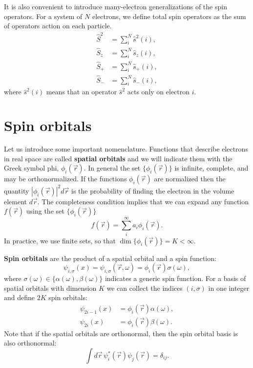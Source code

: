 \documentclass[../Main/chem532-notes.tex]{subfiles}
\begin{document}
It is also convenient to introduce many-electron generalizations of the spin operators.
For a system of $N$ electrons, we define total spin operators as the sum of operators action on each particle.
\begin{align}
\hat{S}^2 &= \sum_i^N \hat{s}^{2}(i), \\
\hat{S}_z &= \sum_i^N \hat{s}_{z}(i), \\
\hat{S}_+ &= \sum_i^N \hat{s}_{+}(i), \\
\hat{S}_- &= \sum_i^N \hat{s}_{-}(i),
\end{align}
where $\hat{s}^{2}(i)$ means that an operator $\hat{s}^{2}$ acts only on electron $i$.


\section{Spin orbitals}
Let us introduce some important nomenclature.
Functions that describe electrons in real space are called \textbf{spatial orbitals} and we will indicate them with the Greek symbol phi, $\phi_i(\vec{r})$.
In general the set $\{ \phi_i(\vec{r}) \}$ is infinite, complete, and may be orthonormalized.
If the functions $\phi_i(\vec{r})$ are normalized then the quantity $|\phi_i(\vec{r})|^2 d\vec{r}$ is the probability of finding the electron in the volume element $d\vec{r}$.
The completeness condition implies that we can expand any function $f(\vec{r})$ using the set $\{ \phi_i(\vec{r}) \}$
\begin{equation}
f(\vec{r}) = \sum_{i}^{\infty} a_i \phi_i(\vec{r}).
\end{equation}
In practice, we use finite sets, so that $\dim \{ \phi_i(\vec{r}) \} = K < \infty$.

\textbf{Spin orbitals} are the product of a spatial orbital and a spin function:
\begin{equation}
\psi_{i,\sigma} (x) = \psi_{i,\sigma} (\vec{r},\omega) = \phi_i(\vec{r}) \sigma(\omega),
\end{equation}
where $\sigma(\omega) \in \{\alpha(\omega),\beta(\omega)\}$ indicates a generic spin function.
For a basis of spatial orbitals with dimension $K$ we can collect the indices $(i,\sigma)$ in one integer and define $2K$ spin orbitals:
\begin{align}
\psi_{2i - 1}(x) &= \phi_i(\vec{r}) \alpha(\omega), \\
\psi_{2i}(x) &= \phi_i(\vec{r}) \beta(\omega).
\end{align}
Note that if the spatial orbitals are orthonormal, then the spin orbital basis is also orthonormal:
\begin{equation}
\int d\vec{r} \, \psi_i^*(\vec{r}) \psi_j(\vec{r})  = \delta_{ij}.
\end{equation}
\end{document}
